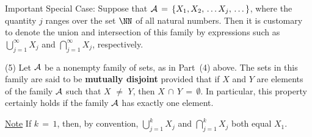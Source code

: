         Important Special Case: Suppose that ${\cal A} \,=\, \{X_{1},X_{2},\,{\ldots}\,X_{j},\,{\ldots}\,\}$, where the quantity $j$ ranges over the set ${\NN}$ of all natural numbers.
    Then it is customary to denote the union and intersection of this family by expressions such as ${\bigcup}_{j=1}^{{\infty}} X_{j}$ and ${\bigcap}_{j=1}^{{\infty}} X_{j}$, respectively.

\V

        (5) Let ${\cal A}$ be a nonempty family of sets, as in Part~(4) above.
The sets in this family are said to be {\bf mutually disjoint}
     provided that if $X$ and $Y$ are elements of the family ${\cal A}$ such that $X \,\,{\neq}\,\, Y$,
    then $X\,{\cap}\,Y \,=\, {\emptyset}$. In particular, this property certainly holds if the family ${\cal A}$ has exactly one element.


\V

        \underline{Note}
    If $k \,=\, 1$, then, by convention, ${\displaystyle {\bigcup}_{j=1}^{k} X_{j}}$ and ${\displaystyle {\bigcap}_{j=1}^{k} X_{j}}$ both equal $X_{1}$.

\VV


